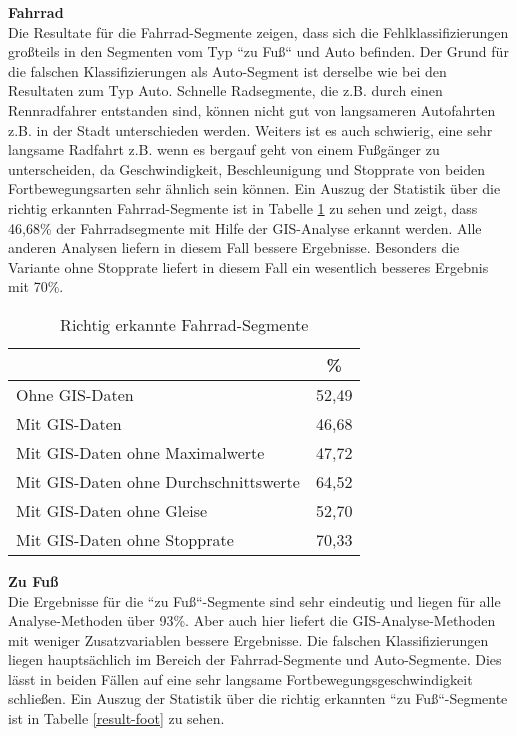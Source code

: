 \textbf{Fahrrad} \\
Die Resultate für die Fahrrad-Segmente zeigen, dass sich die Fehlklassifizierungen großteils in den Segmenten vom Typ ``zu Fuß`` und Auto befinden. Der Grund für die falschen Klassifizierungen als Auto-Segment ist derselbe wie bei den Resultaten zum Typ Auto. Schnelle Radsegmente, die z.B. durch einen Rennradfahrer entstanden sind, können nicht gut von langsameren Autofahrten z.B. in der Stadt unterschieden werden. Weiters ist es auch schwierig, eine sehr langsame Radfahrt z.B. wenn es bergauf geht von einem Fußgänger zu unterscheiden, da Geschwindigkeit, Beschleunigung und Stopprate von beiden Fortbewegungsarten sehr ähnlich sein können. Ein Auszug der Statistik über die richtig erkannten Fahrrad-Segmente ist in Tabelle \ref{result-bike} zu sehen und zeigt, dass 46,68\% der Fahrradsegmente mit Hilfe der GIS-Analyse erkannt werden. Alle anderen Analysen liefern in diesem Fall bessere Ergebnisse. Besonders die Variante ohne Stopprate liefert in diesem Fall ein wesentlich besseres Ergebnis mit 70\%.

\begin{table}[h]
\centering
\begin{tabular}{|l|c|}
\hline
 & \% \\ \hline
Ohne GIS-Daten & 52,49 \\ \hline
Mit GIS-Daten & 46,68 \\ \hline
Mit GIS-Daten ohne Maximalwerte & 47,72 \\ \hline
Mit GIS-Daten ohne Durchschnittswerte & 64,52 \\ \hline
Mit GIS-Daten ohne Gleise & 52,70 \\ \hline
Mit GIS-Daten ohne Stopprate & 70,33 \\ \hline
\end{tabular}
\caption{Richtig erkannte Fahrrad-Segmente}
\label{result-bike}
\end{table}

\textbf{Zu Fuß} \\
Die Ergebnisse für die ``zu Fuß``-Segmente sind sehr eindeutig und liegen für alle Analyse-Methoden über 93\%.  Aber auch hier liefert die GIS-Analyse-Methoden mit weniger Zusatzvariablen bessere Ergebnisse. Die falschen Klassifizierungen liegen hauptsächlich im Bereich der Fahrrad-Segmente und Auto-Segmente. Dies lässt in beiden Fällen auf eine sehr langsame Fortbewegungsgeschwindigkeit schließen. Ein Auszug der Statistik über die richtig erkannten ``zu Fuß``-Segmente ist in Tabelle \ref{result-foot} zu sehen.

